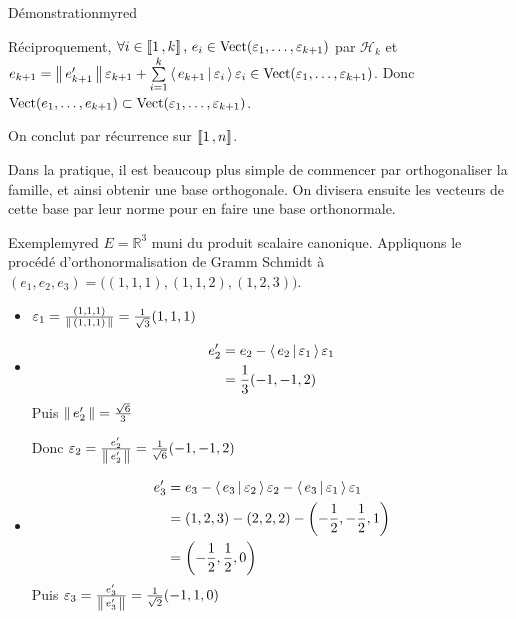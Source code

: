 \begin{demo}{Démonstration}{myred}
\begin{itemize}
                Réciproquement, $\forall i \in \left\llbracket 1 \, , k \right\rrbracket, \, e_i \in \operatorname{Vect}(\varepsilon_1,\ldots,\varepsilon_{k+1})$ par $\mathcal{H}_k$ et $e_{k+1} = \left\lVert\,e_{k+1}'\,\right\rVert \varepsilon_{k+1} + \sum\limits_{i=1}^k \left<\,e_{k+1}\,\middle|\,\varepsilon_i\,\right>\varepsilon_i  \in \operatorname{Vect}(\varepsilon_1,\ldots,\varepsilon_{k+1})$. Donc $\operatorname{Vect}(e_1,\ldots,e_{k+1}) \subset \operatorname{Vect}(\varepsilon_1,\ldots,\varepsilon_{k+1})$.
            \end{itemize}
            On conclut par récurrence sur $\left\llbracket 1 \, , n \right\rrbracket$.
        \end{demo}

        Dans la pratique, il est beaucoup plus simple de commencer par orthogonaliser la famille, et ainsi obtenir une base orthogonale. On divisera ensuite les vecteurs de cette base par leur norme pour en faire une base orthonormale.
    
        \begin{omed}{Exemple}{myred}
            $E = \mathbb{R}^3$ muni du produit scalaire canonique. Appliquons le procédé d’orthonormalisation de Gramm Schmidt à $(e_1,e_2,e_3) = \big((1,1,1),(1,1,2),(1,2,3)\big)$.
            \begin{itemize}
                \item $\varepsilon_1 = \frac{(1,1,1)}{\left\lVert\,(1,1,1)\,\right\rVert} = \frac{1}{\sqrt{3}} (1,1,1)$
                \item \begin{align*}
                    e_2' &= e_2 - \left<\,e_2\,\middle|\,\varepsilon_1\,\right>\varepsilon_1 \\
                    &= \frac{1}{3}(-1,-1,2)
                \end{align*}
                Puis $\left\lVert\,e_2'\,\right\rVert = \frac{\sqrt{6}}{3}$ 
                
                Donc $\varepsilon_2 = \frac{e_2'}{\left\lVert\,e_2'\,\right\rVert} = \frac{1}{\sqrt{6}}(-1,-1,2)$
                \item \begin{align*}
                    e_3' &= e_3 - \left<\,e_3\,\middle|\,\varepsilon_2\,\right>\varepsilon_2 - \left<\,e_3\,\middle|\,\varepsilon_1\,\right>\varepsilon_1 \\
                    &= (1,2,3) - (2,2,2) - \left(-\frac{1}{2}, -\frac{1}{2}, 1\right) \\
                    &= \left(-\frac{1}{2}, \frac{1}{2},0\right)
                \end{align*}
                Puis $\varepsilon_3 = \frac{e_3'}{\left\lVert\,e_3'\,\right\rVert} = \frac{1}{\sqrt{2}}(-1,1,0)$
            \end{itemize}
        \end{omed}

